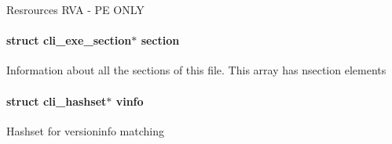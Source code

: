 \label{structcli__exe__info_ac0f1b36bb8a1eeb981958dc4643f67dd}
Resrources RVA -\/ PE ONLY \hypertarget{structcli__exe__info_a1c449c2a02971006b72d8ab755684716}{
\paragraph[{section}]{\setlength{\rightskip}{0pt plus 5cm}struct {\bf cli\_\-exe\_\-section}$\ast$ {\bf section}}\hfill}
\label{structcli__exe__info_a1c449c2a02971006b72d8ab755684716}
Information about all the sections of this file. This array has {\ttfamily nsection} elements \hypertarget{structcli__exe__info_a45edc7cf7855a99b33ce31a17c6bdfc6}{
\paragraph[{vinfo}]{\setlength{\rightskip}{0pt plus 5cm}struct cli\_\-hashset$\ast$ {\bf vinfo}}\hfill}
\label{structcli__exe__info_a45edc7cf7855a99b33ce31a17c6bdfc6}
Hashset for versioninfo matching 